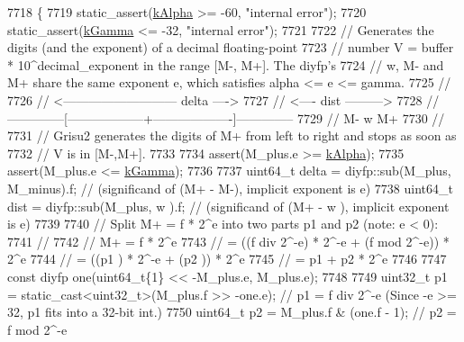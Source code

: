 \begin{DoxyCode}
7718 \{
7719     static\_assert(\hyperlink{namespacenlohmann_1_1detail_1_1dtoa__impl_ac1ea1316de0b4a219f707c76b1db1966}{kAlpha} >= -60, \textcolor{stringliteral}{"internal error"});
7720     static\_assert(\hyperlink{namespacenlohmann_1_1detail_1_1dtoa__impl_a4a750fcc38da1ce68b7e25ab3a230e20}{kGamma} <= -32, \textcolor{stringliteral}{"internal error"});
7721 
7722     \textcolor{comment}{// Generates the digits (and the exponent) of a decimal floating-point}
7723     \textcolor{comment}{// number V = buffer * 10^decimal\_exponent in the range [M-, M+]. The diyfp's}
7724     \textcolor{comment}{// w, M- and M+ share the same exponent e, which satisfies alpha <= e <= gamma.}
7725     \textcolor{comment}{//}
7726     \textcolor{comment}{//               <--------------------------- delta ---->}
7727     \textcolor{comment}{//                                  <---- dist --------->}
7728     \textcolor{comment}{// --------------[------------------+-------------------]--------------}
7729     \textcolor{comment}{//               M-                 w                   M+}
7730     \textcolor{comment}{//}
7731     \textcolor{comment}{// Grisu2 generates the digits of M+ from left to right and stops as soon as}
7732     \textcolor{comment}{// V is in [M-,M+].}
7733 
7734     assert(M\_plus.e >= \hyperlink{namespacenlohmann_1_1detail_1_1dtoa__impl_ac1ea1316de0b4a219f707c76b1db1966}{kAlpha});
7735     assert(M\_plus.e <= \hyperlink{namespacenlohmann_1_1detail_1_1dtoa__impl_a4a750fcc38da1ce68b7e25ab3a230e20}{kGamma});
7736 
7737     uint64\_t delta = diyfp::sub(M\_plus, M\_minus).f; \textcolor{comment}{// (significand of (M+ - M-), implicit exponent is e)}
7738     uint64\_t dist  = diyfp::sub(M\_plus, w      ).f; \textcolor{comment}{// (significand of (M+ - w ), implicit exponent is e)}
7739 
7740     \textcolor{comment}{// Split M+ = f * 2^e into two parts p1 and p2 (note: e < 0):}
7741     \textcolor{comment}{//}
7742     \textcolor{comment}{//      M+ = f * 2^e}
7743     \textcolor{comment}{//         = ((f div 2^-e) * 2^-e + (f mod 2^-e)) * 2^e}
7744     \textcolor{comment}{//         = ((p1        ) * 2^-e + (p2        )) * 2^e}
7745     \textcolor{comment}{//         = p1 + p2 * 2^e}
7746 
7747     \textcolor{keyword}{const} diyfp one(uint64\_t\{1\} << -M\_plus.e, M\_plus.e);
7748 
7749     uint32\_t p1 = \textcolor{keyword}{static\_cast<}uint32\_t\textcolor{keyword}{>}(M\_plus.f >> -one.e); \textcolor{comment}{// p1 = f div 2^-e (Since -e >= 32, p1 fits
       into a 32-bit int.)}
7750     uint64\_t p2 = M\_plus.f & (one.f - 1);                    \textcolor{comment}{// p2 = f mod 2^-e}

\end{DoxyCode}
